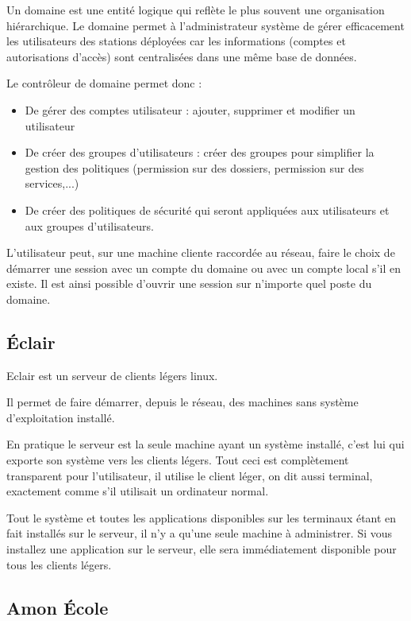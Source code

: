 Un domaine est une entité logique qui reflète le plus souvent une 
organisation hiérarchique. Le domaine permet à l'administrateur système de 
gérer efficacement les utilisateurs des stations déployées car les 
informations (comptes et autorisations d'accès) sont centralisées dans une 
même base de données.

Le contrôleur de domaine permet donc :

\begin{itemize}
  \item De gérer des comptes utilisateur : ajouter, supprimer et modifier 
        un utilisateur
  \item De créer des groupes d'utilisateurs : créer des groupes pour 
        simplifier la gestion des politiques (permission sur des dossiers, 
        permission sur des services,...)
  \item De créer des politiques de sécurité qui seront appliquées aux 
        utilisateurs et aux groupes d'utilisateurs.
\end{itemize}            
 
L'utilisateur peut, sur une machine cliente raccordée au réseau, faire le 
choix de démarrer une session avec un compte du domaine ou avec un compte 
local s'il en existe. Il est ainsi possible d'ouvrir une session sur 
n'importe quel poste du domaine.

\subsection{Éclair}

Eclair est un serveur de clients légers linux.

Il permet de faire démarrer, depuis le réseau, des machines sans système
d'exploitation installé.

En pratique le serveur est la seule machine ayant un système installé, c'est 
lui qui exporte son système vers les clients légers. Tout ceci est 
complètement transparent pour l'utilisateur, il utilise le client léger, on 
dit aussi terminal, exactement comme s'il utilisait un ordinateur normal.

Tout le système et toutes les applications disponibles sur les terminaux étant
en fait installés sur le serveur, il n'y a qu'une seule machine à administrer.
Si vous installez une application sur le serveur, elle sera
immédiatement disponible pour tous les clients légers.

\subsection{Amon École}

